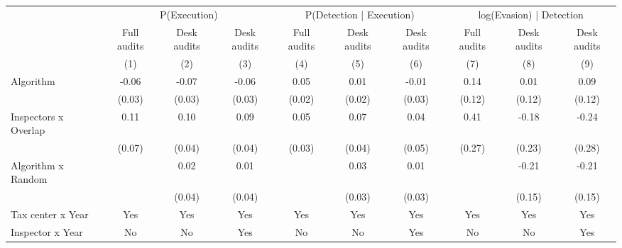 \begin{tabular}{lccc|ccc|ccc} \toprule
\multicolumn{1}{l}{} & \multicolumn{3}{c}{P(Execution)} & \multicolumn{3}{c}{P(Detection | Execution)} & \multicolumn{3}{c}{log(Evasion) | Detection} \\\cmidrule(lr){2-4}\cmidrule(lr){5-7}\cmidrule(lr){8-10} \multicolumn{1}{l}{} & Full audits & Desk audits & Desk audits & Full audits & Desk audits & Desk audits & Full audits & Desk audits & Desk audits \\ \multicolumn{1}{l}{} & (1) & (2) & (3) & (4) & (5) & (6) & (7) & (8) & (9) \\ \midrule
Algorithm   &       -0.06\sym{*}  &       -0.07\sym{***}&       -0.06\sym{**} &        0.05\sym{**} &        0.01         &       -0.01         &        0.14         &        0.01         &        0.09         \\
            &      (0.03)         &      (0.03)         &      (0.03)         &      (0.02)         &      (0.02)         &      (0.03)         &      (0.12)         &      (0.12)         &      (0.12)         \\
\addlinespace
Inspectors x Overlap&        0.11\sym{*}  &        0.10\sym{**} &        0.09\sym{**} &        0.05\sym{*}  &        0.07\sym{**} &        0.04         &        0.41         &       -0.18         &       -0.24         \\
            &      (0.07)         &      (0.04)         &      (0.04)         &      (0.03)         &      (0.04)         &      (0.05)         &      (0.27)         &      (0.23)         &      (0.28)         \\
\addlinespace
Algorithm x Random&                     &        0.02         &        0.01         &                     &        0.03         &        0.01         &                     &       -0.21         &       -0.21         \\
            &                     &      (0.04)         &      (0.04)         &                     &      (0.03)         &      (0.03)         &                     &      (0.15)         &      (0.15)         \\
\midrule
Tax center x Year&         Yes         &         Yes         &         Yes         &         Yes         &         Yes         &         Yes         &         Yes         &         Yes         &         Yes         \\
Inspector x Year&          No         &          No         &         Yes         &          No         &          No         &         Yes         &          No         &          No         &         Yes         \\

\end{tabular}
